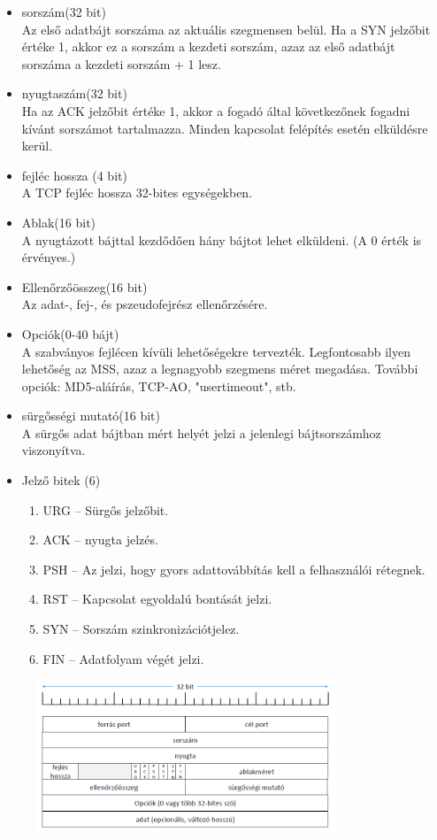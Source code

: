 \documentclass[margin=0px]{article}
\begin{document}
\begin{description}
\begin{itemize}
\begin{itemize}
							\item sorszám(32 bit)\\ 
								Az első adatbájt sorszáma az aktuális szegmensen belül. Ha a SYN jelzőbit értéke 1, akkor ez a sorszám a kezdeti sorszám, azaz az első adatbájt sorszáma a kezdeti sorszám + 1 lesz.
							\item nyugtaszám(32 bit)\\
								Ha az ACK jelzőbit értéke 1, akkor a fogadó által következőnek fogadni 	kívánt sorszámot tartalmazza. Minden kapcsolat felépítés esetén elküldésre kerül.
							\item fejléc hossza (4 bit)\\
								A TCP fejléc hossza 32-bites egységekben.
							\item Ablak(16 bit)\\
								A nyugtázott bájttal kezdődően hány bájtot lehet elküldeni. (A 0 érték is érvényes.)
							\item Ellenőrzőösszeg(16 bit)\\
								Az adat-, fej-, és pszeudofejrész ellenőrzésére.
							 \item Opciók(0-40 bájt)\\
								 A szabványos fejlécen kívüli lehetőségekre tervezték. Legfontosabb ilyen lehetőség az MSS, azaz a legnagyobb szegmens méret megadása. További opciók: MD5-aláírás, TCP-AO, "usertimeout", stb.
							 \item sürgősségi mutató(16 bit) \\
								 A sürgős adat bájtban mért helyét jelzi a jelenlegi bájtsorszámhoz viszonyítva.
							 \item Jelző bitek (6)
								 \begin{enumerate}
							 		\item URG – Sürgős jelzőbit.
							 		\item ACK – nyugta jelzés.
							 		\item PSH – Az jelzi, hogy gyors adattovábbítás kell a felhasználói rétegnek.
							 		\item RST – Kapcsolat egyoldalú bontását jelzi.
							 		\item SYN – Sorszám szinkronizációtjelez.
							 		\item FIN – Adatfolyam végét jelzi.
								 \end{enumerate}		 
							\end{itemize}
							\begin{figure}[H]
								\centering
								\includegraphics[width=0.8\textwidth]{img/tcp_fejlec.png}

\end{figure}
\end{itemize}
\end{description}
\end{document}

